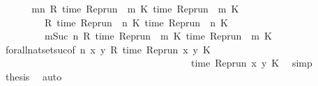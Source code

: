 \begin{isabellebody}
\ {\isacharminus}\isanewline
\ \ \isamarkupfalse%
\ {\isacartoucheopen}{\isacharbraceleft}{\isasymrho}{\isachardot}\ {\isasymforall}m{\isasymge}n{\isachardot}\ R\ {\isacharparenleft}time\ {\isacharparenleft}{\isacharparenleft}Rep{\isacharunderscore}run\ {\isasymrho}{\isacharparenright}\ m\ K\ time\ {\isacharparenleft}{\isacharparenleft}Rep{\isacharunderscore}run\ {\isasymrho}{\isacharparenright}\ m\ K\isanewline
\ \ \ \ \ \ \ {\isacharequal}\ {\isacharbraceleft}{\isasymrho}{\isachardot}\ R\ {\isacharparenleft}time\ {\isacharparenleft}{\isacharparenleft}Rep{\isacharunderscore}run\ {\isasymrho}{\isacharparenright}\ n\ K\ time\ {\isacharparenleft}{\isacharparenleft}Rep{\isacharunderscore}run\ {\isasymrho}{\isacharparenright}\ n\ K\isanewline
\ \ \ \ \ \ \ {\isasyminter}\ {\isacharbraceleft}{\isasymrho}{\isachardot}\ {\isasymforall}m{\isasymge}Suc\ n{\isachardot}\ R\ {\isacharparenleft}time\ {\isacharparenleft}{\isacharparenleft}Rep{\isacharunderscore}run\ {\isasymrho}{\isacharparenright}\ m\ K\ time\ {\isacharparenleft}{\isacharparenleft}Rep{\isacharunderscore}run\ {\isasymrho}{\isacharparenright}\ m\ K\isanewline
\ \ \ \ \isamarkupfalse%
\ forall{\isacharunderscore}nat{\isacharunderscore}set{\isacharunderscore}suc{\isacharbrackleft}of\ {\isacartoucheopen}n{\isacartoucheclose}\ {\isacartoucheopen}{\isasymlambda}x\ y{\isachardot}\ R\ {\isacharparenleft}time\ {\isacharparenleft}{\isacharparenleft}Rep{\isacharunderscore}run\ x{\isacharparenright}\ y\ K\isanewline
\ \ \ \ \ \ \ \ \ \ \ \ \ \ \ \ \ \ \ \ \ \ \ \ \ \ \ \ \ \ \ \ \ \ \ \ \ \ \ time\ {\isacharparenleft}{\isacharparenleft}Rep{\isacharunderscore}run\ x{\isacharparenright}\ y\ K\ \isamarkupfalse%
\ simp\isanewline
\ \ \isamarkupfalse%
\ {\isacharquery}thesis\ \isamarkupfalse%
\ auto\isanewline
{}\isamarkupfalse%
%
\endisatagproof
{\isafoldproof}%
%
\isadelimproof
\isanewline
%
\endisadelimproof

\end{isabellebody}
